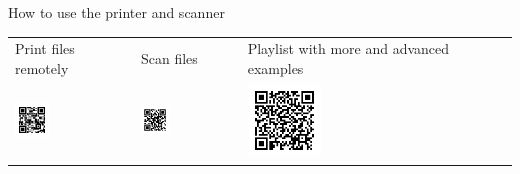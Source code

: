 \documentclass[a4paper]{article}
\begin{document}
\centering\fontsize{40pt}{32pt}\selectfont How to use the printer and scanner

\vspace{1.5cm}

\fontsize{30pt}{24pt}\selectfont
\begin{tabular}{>{\centering}m{}>{\centering}m{}>{\centering}m{}m{0pt}}
  Print files remotely & Scan files & Playlist with more and advanced examples &\\
  \includegraphics[width=0.3\textwidth]{./figures/qr1.png} &
  \includegraphics[width=0.3\textwidth]{./figures/qr2.png} &
  \includegraphics[width=0.3\textwidth]{./figures/qr4.png} &\\
\end{tabular}
\end{document}
